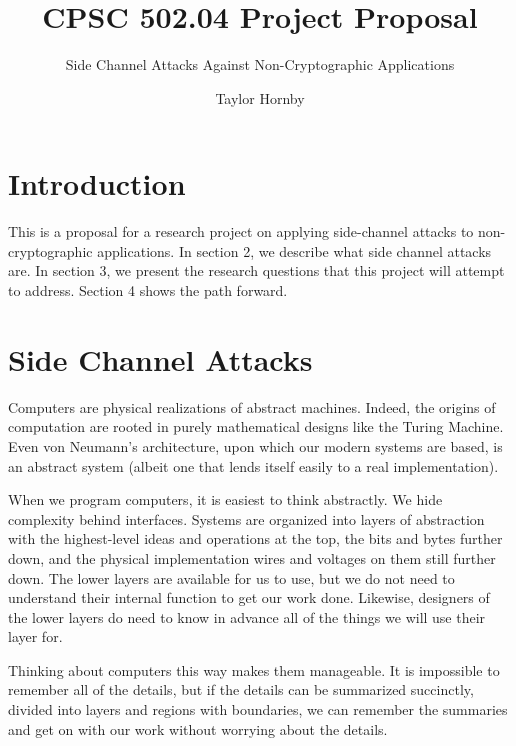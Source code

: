 \documentclass{acm_proc_article-sp}
\begin{document}
\title{CPSC 502.04 Project Proposal}
\subtitle{Side Channel Attacks Against Non-Cryptographic Applications}


\author{
\alignauthor
Taylor Hornby
}

\maketitle

\section{Introduction}

This is a proposal for a research project on applying side-channel attacks to
non-cryptographic applications. In section 2, we describe what side channel
attacks are. In section 3, we present the research questions that this project
will attempt to address. Section 4 shows the path forward.


\section{Side Channel Attacks}

Computers are physical realizations of abstract machines. Indeed, the origins of
computation are rooted in purely mathematical designs like the Turing Machine.
Even von Neumann's architecture, upon which our modern systems are based, is an
abstract system (albeit one that lends itself easily to a real implementation).

When we program computers, it is easiest to think abstractly. We hide complexity
behind interfaces. Systems are organized into layers of abstraction with the
highest-level ideas and operations at the top, the bits and bytes further down,
and the physical implementation \textendash wires and voltages on them
\textendash still further down. The lower layers are available for us to use,
but we do not need to understand their internal function to get our work done.
Likewise, designers of the lower layers do need to know in advance all of the
things we will use their layer for.

Thinking about computers this way makes them manageable. It is impossible to
remember all of the details, but if the details can be summarized succinctly,
divided into layers and regions with boundaries, we can remember the summaries
and get on with our work without worrying about the details.
\end{document}
